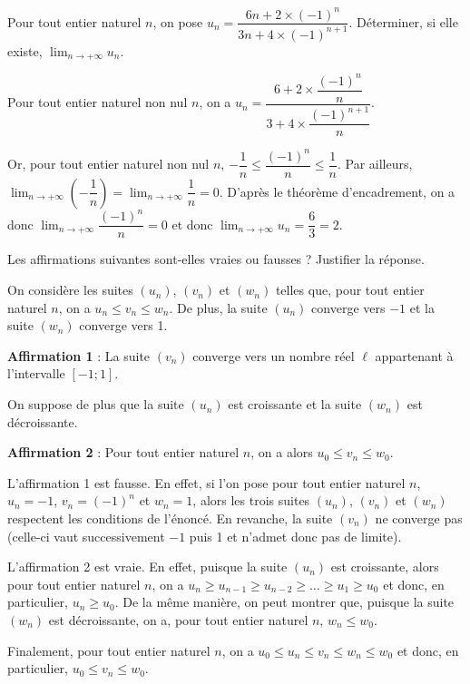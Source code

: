 \documentclass[11pt,fleqn, openany]{book} %
\begin{document}
\begin{exercise}[topic=lim11]Pour tout entier naturel $n$, on pose $u_n=\dfrac{6n+2\times (-1)^n}{3n+4\times(-1)^{n+1}}$. Déterminer, si elle existe, $\displaystyle\lim_{n \to + \infty}u_n$.\end{exercise}

\begin{solution}Pour tout entier naturel non nul $n$, on a $ u_n = \dfrac{6+2\times \dfrac{(-1)^n}{n}}{3+4\times \dfrac{(-1)^{n+1}}{n}} $.

Or, pour tout entier naturel non nul $n$, $-\dfrac{1}{n} \leqslant \dfrac{(-1)^n}{n} \leqslant \dfrac{1}{n}$. Par ailleurs, $\displaystyle \lim_{n\to + \infty} \left(-\dfrac{1}{n}\right)=\displaystyle \lim_{n\to + \infty} \dfrac{1}{n}=0$. D'après le théorème d'encadrement, on a donc $\displaystyle \lim_{n\to + \infty} \dfrac{(-1)^n}{n}=0$ et donc $\displaystyle \lim_{n\to + \infty} u_n = \dfrac{6}{3}=2$.
\end{solution}

\begin{exercise}[topic=lim11, subtitle={(Métropole 2024)}]Les affirmations suivantes sont-elles vraies ou fausses ? Justifier la réponse.

On considère les suites $(u_n)$, $(v_n)$ et $(w_n)$ telles que, pour tout entier naturel $n$, on a $u_n \leqslant v_n \leqslant w_n$. De plus, la suite $(u_n)$ converge vers $-1$ et la suite $(w_n)$ converge vers 1.

\textbf{Affirmation 1} : La suite $(v_n)$ converge vers un nombre réel $\ell$ appartenant à l'intervalle $[-1;1]$.

On suppose de plus que la suite $(u_n)$ est croissante et la suite $(w_n)$ est décroissante.

\textbf{Affirmation 2} : Pour tout entier naturel $n$, on a alors $u_0 \leqslant v_n \leqslant w_0$.
\end{exercise}

\begin{solution}
L'affirmation 1 est fausse. En effet, si l'on pose pour tout entier naturel $n$, $u_n=-1$, $v_n=(-1)^n$ et $w_n=1$, alors les trois suites $(u_n)$, $(v_n)$ et $(w_n)$ respectent les conditions de l'énoncé. En revanche, la suite $(v_n)$ ne converge pas (celle-ci vaut successivement $-1$ puis 1 et n'admet donc pas de limite).

L'affirmation 2 est vraie. En effet, puisque la suite $(u_n)$ est croissante, alors pour tout entier naturel $n$, on a $u_{n}\geqslant u_{n-1} \geqslant u_{n-2} \geqslant \ldots \geqslant u_1 \geqslant u_0$ et donc, en particulier, $u_n\geqslant u_0$. De la même manière, on peut montrer que, puisque la suite $(w_n)$ est décroissante, on a, pour tout entier naturel $n$, $w_n\leqslant w_0$.

Finalement, pour tout entier naturel $n$, on a $u_0 \leqslant u_n \leqslant v_n \leqslant w_n \leqslant w_0$ et donc, en particulier, $u_0 \leqslant v_n \leqslant w_0$.
\newpage
\end{solution}
\end{document}
